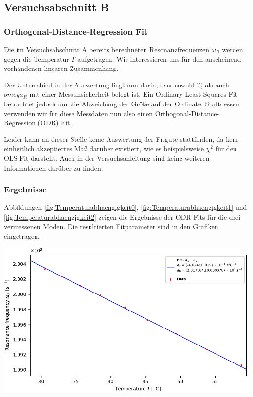 \subsection{Versuchsabschnitt B}

\subsubsection*{Orthogonal-Distance-Regression Fit}

Die im Versuchsabschnitt A bereits berechneten Resonanzfrequenzen $\omega_R$ werden gegen die Temperatur $T$ aufgetragen.
Wir interessieren uns für den anscheinend vorhandenen linearen Zusammenhang.

Der Unterschied in der Auswertung liegt nun darin, dass sowohl $T$, als auch $omega_R$ mit einer Messunsicherheit belegt ist.
Ein Ordinary-Least-Squares Fit betrachtet jedoch nur die Abweichung der Größe auf der Ordinate.
Stattdessen verwenden wir für diese Messdaten nun also einen Orthogonal-Distance-Regression (ODR) Fit.

Leider kann an dieser Stelle keine Auswertung der Fitgüte stattfinden, da kein einheitlich akzeptiertes Maß darüber existiert, wie es beispielsweise $\chi^2$ für den OLS Fit darstellt.
Auch in der Versuchsanleitung \cite{Anleitung} sind keine weiteren Informationen darüber zu finden.

\subsubsection*{Ergebnisse}

Abbildungen \ref{fig:Temperaturabhaengigkeit0}, \ref{fig:Temperaturabhaengigkeit1} und \ref{fig:Temperaturabhaengigkeit2} zeigen die Ergebnisse der ODR Fits für die drei vermessenen Moden.
Die resultierten Fitparameter sind in den Grafiken eingetragen.

\minipage{\linewidth}
    \begin{center}
        \captionsetup{type=figure}
        \begin{adjustbox}{max width=\linewidth, keepaspectratio}
            \includegraphics[]{pdf/T_0}
        \end{adjustbox}
        \label{fig:Temperaturabhaengigkeit0}
    \end{center}
\endminipage

